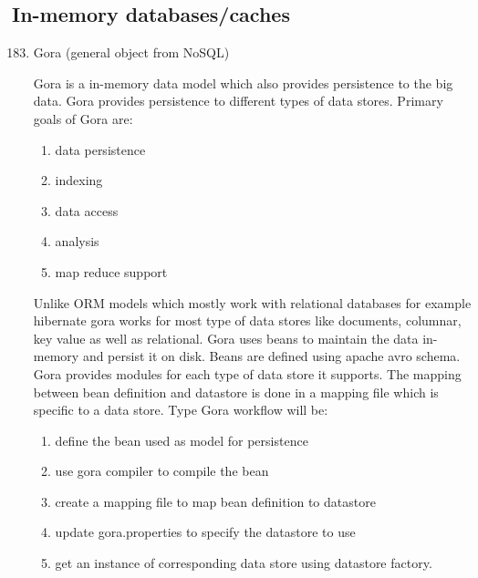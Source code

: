 \subsection{In-memory databases/caches}
\label{\detokenize{i524/technologies:in-memory-databases-caches}}\begin{enumerate}
\setcounter{enumi}{182}
\item {} 
Gora (general object from NoSQL)

Gora is a in-memory data model \label{\detokenize{i524/technologies:id338}}{\hyperref[\detokenize{i524/technologies:www-gora}]{\sphinxcrossref{{[}289{]}}}} which also
provides persistence to the big data. Gora provides persistence
to different types of data stores. Primary goals of Gora are:
\begin{enumerate}
\item {} 
data persistence

\item {} 
indexing

\item {} 
data access

\item {} 
analysis

\item {} 
map reduce support

\end{enumerate}

Unlike ORM models which mostly work with relational databases for
example hibernate gora works for most type of data stores like
documents, columnar, key value as well as relational. Gora uses
beans to maintain the data in-memory and persist it on
disk. Beans are defined using apache avro schema. Gora provides
modules for each type of data store it supports.  The mapping
between bean definition and datastore is done in a mapping file
which is specific to a data store.  Type Gora workflow will be:
\begin{enumerate}
\item {} 
define  the bean used as model for persistence

\item {} 
use gora compiler to compile the bean

\item {} 
create a mapping file to map bean definition to datastore

\item {} 
update gora.properties to specify the datastore to use

\item {} 
get an instance of corresponding data store using datastore factory.


\end{enumerate}
\end{enumerate}
